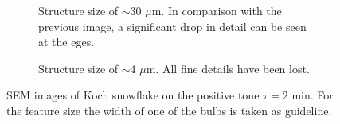 \begin{figure}[htb]
\begin{subfigure}[t]{0.32\linewidth}
      	\caption{Structure size of $\sim$30 $\mu$m. In comparison with the previous image, a significant drop in detail can be seen at the eges.}
      	\label{fig:b2d20_q20}
    \end{subfigure}
    \hfill
    \begin{subfigure}[t]{0.32\linewidth}
      	\caption{Structure size of $\sim$4 $\mu$m. All fine details have been lost.}
      	\label{fig:b2d21_q21}
    \end{subfigure}
    \caption{SEM images of Koch snowflake on the positive tone $\tau = 2$ min. For the feature size the width of one of the bulbs is taken as guideline.}
\end{figure}

